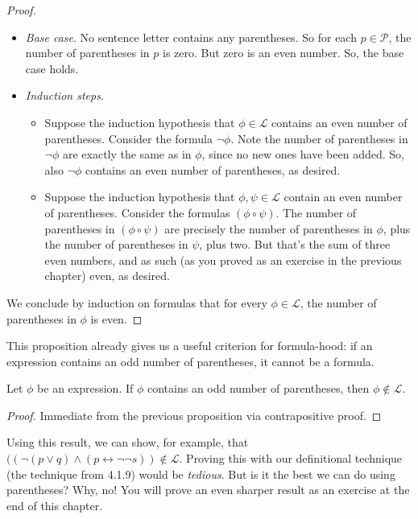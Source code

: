 \begin{enumerate}[\thesection.1]
\begin{proof}
	\begin{itemize}
	
		\item \emph{Base case}. No sentence letter contains any parentheses. So for each $p\in\mathcal{P}$, the number of parentheses in $p$ is zero. But zero is an even number. So, the base case holds.
		
		\item \emph{Induction steps.}
		
		\begin{itemize}
		
			\item Suppose the induction hypothesis that $\phi\in\mathcal{L}$ contains an even number of parentheses. Consider the formula $\neg\phi$. Note the number of parentheses in $\neg\phi$ are exactly the same as in $\phi$, since no new ones have been added. So, also $\neg\phi$ contains an even number of parentheses, as desired.
			
			\item Suppose the induction hypothesis that $\phi,\psi\in\mathcal{L}$ contain an even number of parentheses. Consider the formulas $(\phi\circ\psi)$. The number of parentheses in $(\phi\circ\psi)$ are precisely the number of parentheses in $\phi$, plus the number of parentheses in $\psi$, plus two. But that's the sum of three even numbers, and as such (as you proved as an exercise in the previous chapter) even, as desired.
		
		\end{itemize}
	
	\end{itemize}
	
	We conclude by induction on formulas that for every $\phi\in\mathcal{L}$, the number of parentheses in $\phi$ is even.
	
	\end{proof}
	
	This proposition already gives us a useful criterion for formula-hood: if an expression contains an odd number of parentheses, it cannot be a formula.
	
	\begin{corollary}
	Let $\phi$ be an expression. If $\phi$ contains an odd number of parentheses, then $\phi\notin\mathcal{L}$.
	\end{corollary}
	\begin{proof}
	Immediate from the previous proposition via contrapositive proof.
	\end{proof}
	Using this result, we can show, for example, that $((\neg(p\lor q)\land (p\leftrightarrow\neg\neg s))\notin\mathcal{L}$. Proving this with our definitional technique (the technique from 4.1.9) would be \emph{tedious}. But is it the best we can do using parentheses? Why, no! You will prove an even sharper result as an exercise at the end of this chapter.
			

\end{enumerate}
